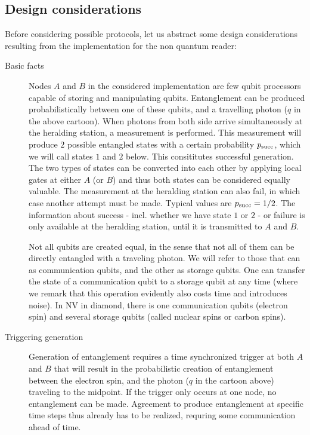 \documentclass{article}
\begin{document}
\subsection{Design considerations}
Before considering possible protocols, let us abstract some design considerations resulting from the implementation for the non quantum reader:
\begin{description}
\item[Basic facts]
Nodes $A$ and $B$ in the considered implementation are few qubit processors capable of storing and manipulating qubits.
Entanglement can be produced probabilistically between one of these qubits, and a travelling photon ($q$ in the above cartoon).
When photons from both side arrive simultaneously at the heralding station, a measurement is performed. This measurement will produce $2$ possible
entangled states with a certain probability $p_{\rm succ}$, which we will call states $1$ and $2$ below. This consititutes successful generation. 
The two types of states can be converted into each other by applying local gates at either $A$ (or $B$) and thus both states can be considered equally valuable. The 
measurement at the heralding station can also fail, in which case another attempt must be made. Typical values are $p_{\rm succ} = 1/2$. 
The information about success - incl. whether we have state $1$ or $2$ - or failure is only available at the heralding station, until it is transmitted
to $A$ and $B$.

Not all qubits are created equal, in the sense that not all of them can be directly entangled with a traveling photon. We will refer to those that can
as communication qubits, and the other as storage qubits. One can transfer the state of a communication qubit to a storage qubit at any time (where we remark that this operation evidently also costs time and introduces noise). In NV in diamond,
there is one communication qubits (electron spin) and several storage qubits (called nuclear spins or carbon spins).

\item[Triggering generation]
Generation of entanglement requires a time synchronized trigger at both $A$ and $B$ that will result in the probabilistic 
creation of entanglement between the electron spin, and the photon ($q$ in the cartoon above) traveling to the midpoint.
If the trigger only occurs at one node, no entanglement can be made. Agreement to produce entanglement at specific time steps thus already has to be realized, requring some communication ahead of time.


\end{description}
\end{document}
